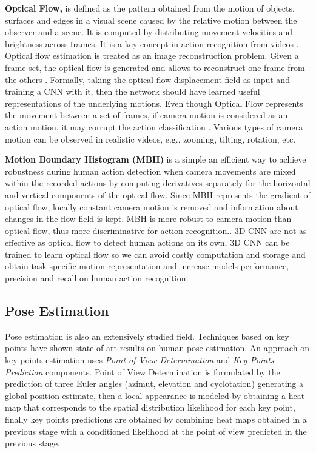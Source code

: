 \documentclass[twocolumn,conference]{article}
\begin{document}
\textbf{Optical Flow,} is defined as the pattern obtained from the motion of objects, surfaces and edges in a visual scene caused by the relative motion between the observer and a scene. It is computed by distributing movement velocities and brightness across frames. It is a  key concept in action recognition from videos \cite{wang2019hallucinating}. Optical flow estimation is treated as an image reconstruction problem. Given a frame set, the optical flow is generated and allows to reconstruct one frame from the others \cite{zhu2018hidden}. Formally, taking the optical flow displacement field as input and training a CNN with it, then the network should have learned useful representations of the underlying motions. Even though Optical Flow represents the movement between a set of frames, if camera motion is considered as an action motion, it may corrupt the action classification \cite{wang2013dense}. Various types of camera motion can be observed in realistic videos, e.g., zooming, tilting, rotation, etc.

\textbf{Motion Boundary Histogram (MBH)} is a simple an efficient way to achieve robustness during human action detection when camera movements are mixed within the recorded actions by computing derivatives separately for the horizontal and vertical components of the optical flow. Since MBH represents the gradient of optical flow, locally constant camera motion is removed and information about changes in the flow field is kept. MBH is more robust to camera motion than optical flow, thus more discriminative for action recognition.\cite{wang2013dense}. 3D CNN are not as effective as optical flow to detect human actions on its own, 3D CNN can be trained to learn optical flow so we can avoid costly computation and storage and obtain task-specific motion representation  \cite{zhu2018hidden} and increase models performance, precision and recall on human action recognition.
\subsection{Pose Estimation}
Pose estimation is also an extensively studied field. Techniques based on key points have shown state-of-art results on human pose estimation. An approach on key points estimation \cite{tulsianiMalik} uses \textit{Point of View Determination} and \textit{Key Points Prediction} components. Point of View Determination is formulated by the prediction of three Euler angles (azimut, elevation and cyclotation) generating a global position estimate, then a local appearance is modeled by obtaining a heat map that corresponds to the spatial distribution likelihood for each key point, finally key points predictions are obtained by combining heat maps obtained in a previous stage with a conditioned likelihood at the point of view predicted in the previous stage.
\end{document}

